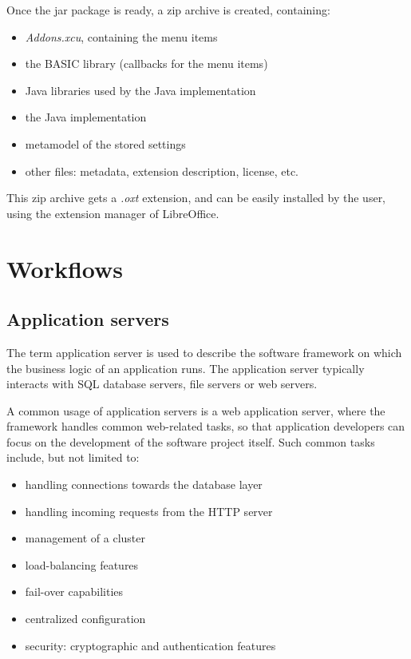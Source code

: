 Once the jar package is ready, a zip archive is created, containing:

\begin{itemize}
\item \emph{Addons.xcu}, containing the menu items
\item the BASIC library (callbacks for the menu items)
\item Java libraries used by the Java implementation
\item the Java implementation
\item metamodel of the stored settings
\item other files: metadata, extension description, license, etc.
\end{itemize}

This zip archive gets a \emph{.oxt} extension, and can be easily installed
by the user, using the extension manager of LibreOffice.

\section{Workflows}

\subsection{Application servers}

The term application server is used to describe the software framework on which
the business logic of an application runs. The application server typically
interacts with SQL database servers, file servers or web servers.


A common usage of application servers is a web application server, where the
framework handles common web-related tasks, so that application developers can
focus on the development of the software project itself. Such common tasks
include, but not limited to:

\begin{itemize}
\item handling connections towards the database layer
\item handling incoming requests from the HTTP server
\item management of a cluster
\item load-balancing features
\item fail-over capabilities
\item centralized configuration
\item security: cryptographic and authentication features
\end{itemize}

